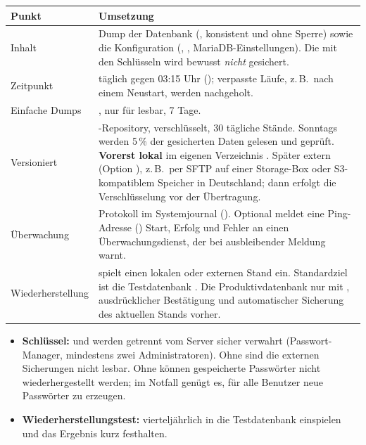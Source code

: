 \begin{center}
\begin{tabularx}{\textwidth}{L{3.2cm}X}
\toprule
\textbf{Punkt} & \textbf{Umsetzung} \\
\midrule
Inhalt & Dump der Datenbank  (, konsistent und ohne Sperre) sowie die
  Konfiguration (, ,
  MariaDB-Einstellungen). Die  mit den Schlüsseln wird
  bewusst \emph{nicht} gesichert. \\
\addlinespace
Zeitpunkt & täglich gegen 03:15 Uhr ();
  verpasste Läufe, z.\,B.\ nach einem Neustart, werden nachgeholt. \\
\addlinespace
Einfache Dumps & , nur für 
  lesbar, 7 Tage. \\
\addlinespace
Versioniert & -Repository, verschlüsselt, 30 tägliche Stände.
  Sonntags werden 5\,\% der gesicherten Daten gelesen und geprüft.
  \textbf{Vorerst lokal} im eigenen Verzeichnis
  . Später extern (Option ),
  z.\,B.\ per SFTP auf einer Storage-Box oder S3-kompatiblem Speicher in
  Deutschland; dann erfolgt die Verschlüsselung vor der Übertragung. \\
\addlinespace
Überwachung & Protokoll im Systemjournal (). Optional meldet eine Ping-Adresse
  () Start, Erfolg und Fehler an einen
  Überwachungsdienst, der bei ausbleibender Meldung warnt. \\
\addlinespace
Wiederherstellung &  spielt einen lokalen oder
  externen Stand ein. Standardziel ist die Testdatenbank
  . Die Produktivdatenbank nur mit ,
  ausdrücklicher Bestätigung und automatischer Sicherung des aktuellen
  Stands vorher. \\
\bottomrule
\end{tabularx}
\end{center}

\begin{itemize}
  \item \textbf{Schlüssel:}  und 
        werden getrennt vom Server sicher verwahrt (Passwort-Manager,
        mindestens zwei Administratoren). Ohne  sind
        die externen Sicherungen nicht lesbar. Ohne  können
        gespeicherte Passwörter nicht wiederhergestellt werden; im Notfall
        genügt es, für alle Benutzer neue Passwörter zu erzeugen.
  \item \textbf{Wiederherstellungstest:} vierteljährlich
         in die Testdatenbank einspielen
        und das Ergebnis kurz festhalten.
\end{itemize}

